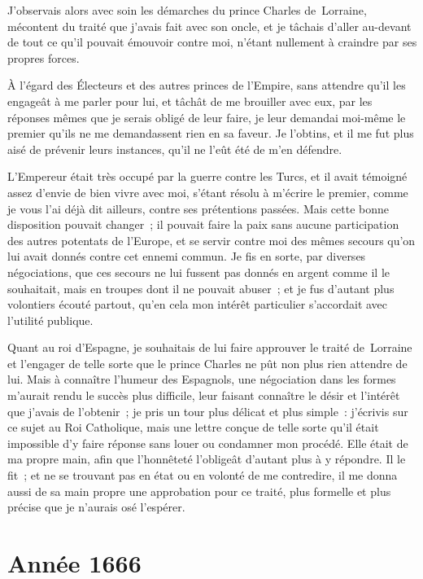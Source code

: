 \documentclass[french,twoside]{book} %
\begin{document}
J’observais alors avec soin les démarches du prince Charles de Lorraine, mécontent du traité que j’avais fait avec son oncle, et je tâchais d’aller au-devant de tout ce qu’il pouvait émouvoir contre moi, n’étant nullement à craindre par ses propres forces.\par
À l’égard des Électeurs et des autres princes de l’Empire, sans attendre qu’il les engageât à me parler pour lui, et tâchât de me brouiller avec eux, par les réponses mêmes que je serais obligé de leur faire, je leur demandai moi-même le premier qu’ils ne me demandassent rien en sa faveur. Je l’obtins, et il me fut plus aisé de prévenir leurs instances, qu’il ne l’eût été de m’en défendre.\par
L’Empereur était très occupé par la guerre contre les Turcs, et il avait témoigné assez d’envie de bien vivre avec moi, s’étant résolu à m’écrire le premier, comme je vous l’ai déjà dit ailleurs, contre ses prétentions passées. Mais cette bonne disposition pouvait changer ; il pouvait faire la paix sans aucune participation des autres potentats de l’Europe, et se servir contre moi des mêmes secours qu’on lui avait donnés contre cet ennemi commun. Je fis en sorte, par diverses négociations, que ces secours ne lui fussent pas donnés en argent comme il le souhaitait, mais en troupes dont il ne pouvait abuser ; et je fus d’autant plus volontiers écouté partout, qu’en cela mon intérêt particulier s’accordait avec l’utilité publique.\par
Quant au roi d’Espagne, je souhaitais de lui faire approuver le traité de Lorraine et l’engager de telle sorte que le prince Charles ne pût non plus rien attendre de lui. Mais à connaître l’humeur des Espagnols, une négociation dans les formes m’aurait rendu le succès plus difficile, leur faisant connaître le désir et l’intérêt que j’avais de l’obtenir ; je pris un tour plus délicat et plus simple : j’écrivis sur ce sujet au Roi Catholique, mais une lettre conçue de telle sorte qu’il était impossible d’y faire réponse sans louer ou condamner mon procédé. Elle était de ma propre main, afin que l’honnêteté l’obligeât d’autant plus à y répondre. Il le fit ; et ne se trouvant pas en état ou en volonté de me contredire, il me donna aussi de sa main propre une approbation pour ce traité, plus formelle et plus précise que je n’aurais osé l’espérer.
\section[{Année 1666}]{Année 1666}\renewcommand{\leftmark}{Année 1666}
\end{document}
